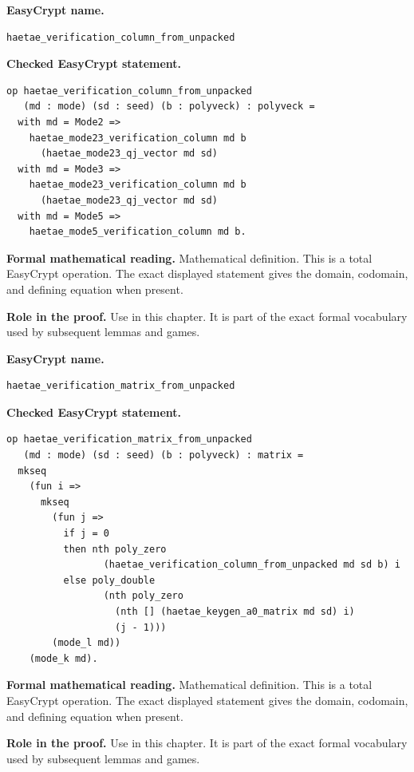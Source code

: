 \begin{formaldefinition}
\noindent\textbf{EasyCrypt name.}
\begin{lstlisting}[language=EasyCrypt,basicstyle=\ttfamily\scriptsize]
haetae_verification_column_from_unpacked
\end{lstlisting}
\noindent\textbf{Checked EasyCrypt statement.}
\begin{lstlisting}[language=EasyCrypt,basicstyle=\ttfamily\scriptsize]
op haetae_verification_column_from_unpacked
   (md : mode) (sd : seed) (b : polyveck) : polyveck =
  with md = Mode2 =>
    haetae_mode23_verification_column md b
      (haetae_mode23_qj_vector md sd)
  with md = Mode3 =>
    haetae_mode23_verification_column md b
      (haetae_mode23_qj_vector md sd)
  with md = Mode5 =>
    haetae_mode5_verification_column md b.
\end{lstlisting}
\noindent\textbf{Formal mathematical reading.}
Mathematical definition. This is a total EasyCrypt operation.  The exact displayed statement gives the domain, codomain, and defining equation when present.

\noindent\textbf{Role in the proof.}
Use in this chapter. It is part of the exact formal vocabulary used by subsequent lemmas and games.

\end{formaldefinition}

\begin{formaldefinition}
\noindent\textbf{EasyCrypt name.}
\begin{lstlisting}[language=EasyCrypt,basicstyle=\ttfamily\scriptsize]
haetae_verification_matrix_from_unpacked
\end{lstlisting}
\noindent\textbf{Checked EasyCrypt statement.}
\begin{lstlisting}[language=EasyCrypt,basicstyle=\ttfamily\scriptsize]
op haetae_verification_matrix_from_unpacked
   (md : mode) (sd : seed) (b : polyveck) : matrix =
  mkseq
    (fun i =>
      mkseq
        (fun j =>
          if j = 0
          then nth poly_zero
                 (haetae_verification_column_from_unpacked md sd b) i
          else poly_double
                 (nth poly_zero
                   (nth [] (haetae_keygen_a0_matrix md sd) i)
                   (j - 1)))
        (mode_l md))
    (mode_k md).
\end{lstlisting}
\noindent\textbf{Formal mathematical reading.}
Mathematical definition. This is a total EasyCrypt operation.  The exact displayed statement gives the domain, codomain, and defining equation when present.

\noindent\textbf{Role in the proof.}
Use in this chapter. It is part of the exact formal vocabulary used by subsequent lemmas and games.

\end{formaldefinition}

